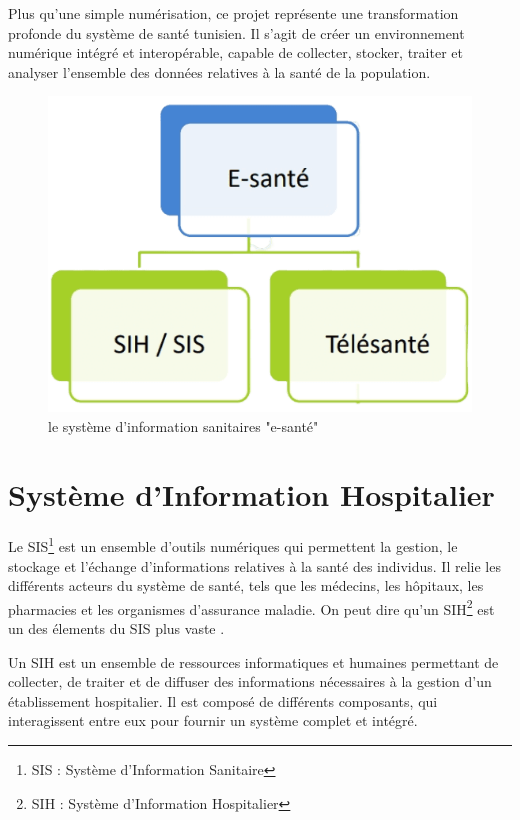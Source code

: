 \documentclass[12pt]{rapportINPTCLOUD}
\begin{document}
	Plus qu'une simple numérisation, ce projet représente une transformation profonde du système de santé tunisien. Il s'agit de créer un environnement numérique intégré et interopérable, capable de collecter, stocker, traiter et analyser l'ensemble des données relatives à la santé de la population.\\
	
	\begin{figure}[H]
		\centering
		\includegraphics[width=1\linewidth]{img/m-sih-sis.png}
		\caption{le système d'information sanitaires "e-santé"}
		\label{fig:e-santé}
	\end{figure}
	
	\chapter{\textcolor{chapitrecolor}{Système d'Information Hospitalier}}
	
	Le SIS\footnote{SIS : Système d'Information Sanitaire} est un ensemble d'outils numériques qui permettent la gestion, le stockage et l'échange d'informations relatives à la santé des individus. Il relie les différents acteurs du système de santé, tels que les médecins, les hôpitaux, les pharmacies et les organismes d'assurance maladie.
	On peut dire qu’un SIH\footnote{SIH : Système d'Information Hospitalier} est un des élements du SIS plus vaste .
	
	Un SIH est un ensemble de ressources informatiques et humaines permettant de collecter, de traiter et de diffuser des informations nécessaires à la gestion d'un établissement hospitalier. Il est composé de différents composants, qui interagissent entre eux pour fournir un système complet et intégré.
\end{document}
